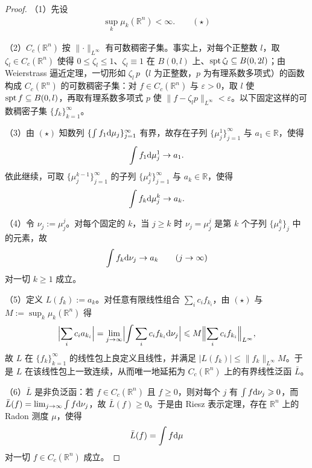 \documentclass[../../main.tex]{subfiles}%
\begin{document}
\begin{proof}
（1）先设
\begin{align*}
\sup_k\mu_k(\mathbb{R}^n)<\infty .\qquad(\star)
\end{align*}

（2）$C_c(\mathbb{R}^n)$ 按 $\lVert\cdot\rVert_{L^\infty}$ 有可数稠密子集。事实上，对每个正整数 $l$，取 $\zeta_l\in C_c(\mathbb{R}^n)$ 使得 $0\leqslant\zeta_l\leqslant1$、$\zeta_l\equiv1$ 在 $B(0,l)$ 上、$\operatorname{spt}\zeta_l\subseteq B(0,2l)$；由 Weierstrass 逼近定理，一切形如 $\zeta_l\,p$（$l$ 为正整数，$p$ 为有理系数多项式）的函数构成 $C_c(\mathbb{R}^n)$ 的可数稠密子集：对 $f\in C_c(\mathbb{R}^n)$ 与 $\varepsilon>0$，取 $l$ 使 $\operatorname{spt} f\subseteq B(0,l)$，再取有理系数多项式 $p$ 使 $\lVert f-\zeta_lp\rVert_{L^\infty}<\varepsilon$。以下固定这样的可数稠密子集 $\{f_k\}_{k=1}^{\infty}$。

（3）由 $(\star)$ 知数列 $\{\int f_1\mathrm{d}\mu_j\}_{j=1}^{\infty}$ 有界，故存在子列 $\{\mu_j^1\}_{j=1}^{\infty}$ 与 $a_1\in\mathbb{R}$，使得
\begin{align*}
\int f_1\mathrm{d}\mu_j^1\to a_1 .
\end{align*}
依此继续，可取 $\{\mu_j^{k-1}\}_{j=1}^{\infty}$ 的子列 $\{\mu_j^{k}\}_{j=1}^{\infty}$ 与 $a_k\in\mathbb{R}$，使得
\begin{align*}
\int f_k\mathrm{d}\mu_j^k\to a_k .
\end{align*}

（4）令 $\nu_j:=\mu_j^j$。对每个固定的 $k$，当 $j\geqslant k$ 时 $\nu_j=\mu_j^j$ 是第 $k$ 个子列 $\{\mu_j^{k}\}_{j}$ 中的元素，故
\begin{align*}
\int f_k\mathrm{d}\nu_j\to a_k\qquad(j\to\infty)
\end{align*}
对一切 $k\geqslant1$ 成立。

（5）定义 $L(f_k):=a_k$。对任意有限线性组合 $\sum_{i}c_if_{k_i}$，由 $(\star)$ 与 $M:=\sup_k\mu_k(\mathbb{R}^n)$ 得
\begin{align*}
\Bigl\lvert\sum_{i}c_ia_{k_i}\Bigr\rvert=\lim_{j\to\infty}\Bigl\lvert\int\sum_{i}c_if_{k_i}\mathrm{d}\nu_j\Bigr\rvert\leqslant M\Bigl\lVert\sum_{i}c_if_{k_i}\Bigr\rVert_{L^\infty},
\end{align*}
故 $L$ 在 $\{f_k\}_{k=1}^{\infty}$ 的线性包上良定义且线性，并满足 $\lvert L(f_k)\rvert\leqslant\lVert f_k\rVert_{L^\infty}M$。于是 $L$ 在该线性包上一致连续，从而唯一地延拓为 $C_c(\mathbb{R}^n)$ 上的有界线性泛函 $\bar L$。

（6）$\bar L$ 是非负泛函：若 $f\in C_c(\mathbb{R}^n)$ 且 $f\geqslant0$，则对每个 $j$ 有 $\int f\mathrm{d}\nu_j\geqslant0$，而 $\bar L(f)=\lim_{j\to\infty}\int f\mathrm{d}\nu_j$，故 $\bar L(f)\geqslant0$。于是由 Riesz 表示定理，存在 $\mathbb{R}^n$ 上的 Radon 测度 $\mu$，使得
\begin{align*}
\bar L(f)=\int f\mathrm{d}\mu
\end{align*}
对一切 $f\in C_c(\mathbb{R}^n)$ 成立。


\end{proof}
\end{document}

